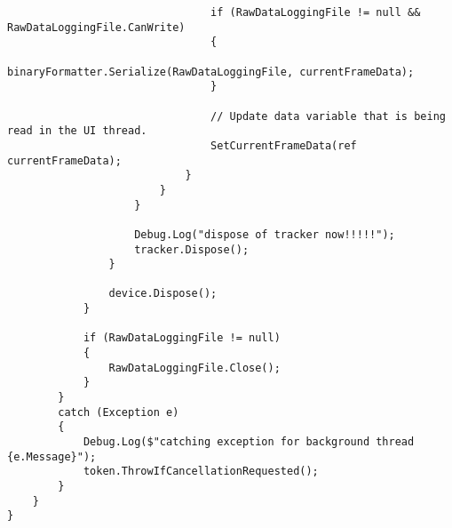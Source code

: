 \begin{verbatim}
                                if (RawDataLoggingFile != null && RawDataLoggingFile.CanWrite)
                                {
                                    binaryFormatter.Serialize(RawDataLoggingFile, currentFrameData);
                                }

                                // Update data variable that is being read in the UI thread.
                                SetCurrentFrameData(ref currentFrameData);
                            }
                        }
                    }

                    Debug.Log("dispose of tracker now!!!!!");
                    tracker.Dispose();
                }

                device.Dispose();
            }

            if (RawDataLoggingFile != null)
            {
                RawDataLoggingFile.Close();
            }
        }
        catch (Exception e)
        {
            Debug.Log($"catching exception for background thread {e.Message}");
            token.ThrowIfCancellationRequested();
        }
    }
}
\end{verbatim}
